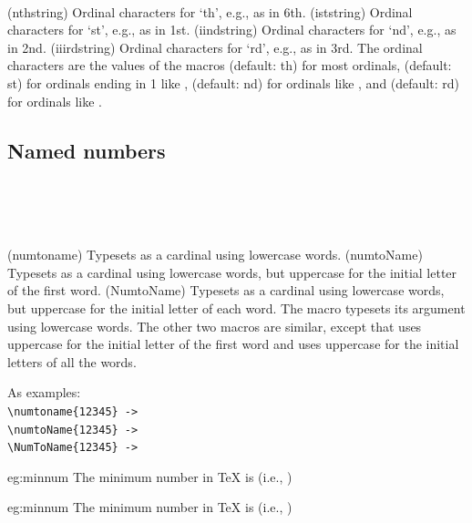 \begin{syntax}
\cmd{\nthstring} \cmd{\iststring} \cmd{\iindstring} \cmd{\iiirdstring} \\
\end{syntax}
\glossary(nthstring)%
  {}%
  {Ordinal characters for `th', e.g., as in 6th.}
\glossary(iststring)%
  {}%
  {Ordinal characters for `st', e.g., as in 1st.}
\glossary(iindstring)%
  {}%
  {Ordinal characters for `nd', e.g., as in 2nd.}
\glossary(iiirdstring)%
  {}%
  {Ordinal characters for `rd', e.g., as in 3rd.}
The ordinal characters are the values of the macros \cmd{\nthstring}
(default: th) for most ordinals, \cmd{\iststring} (default: st) for
ordinals ending in 1 like , \cmd{\iindstring} (default: nd)
for ordinals like , and \cmd{\iiirdstring} (default: rd)
for ordinals like .


\subsection{Named numbers}


\begin{syntax}
\cmd{\numtoname} \\
\cmd{\numtoName} \\
\cmd{\NumToName} \\
\end{syntax}
\glossary(numtoname)%
  {}%
  {Typesets  as a cardinal using lowercase words.}
\glossary(numtoName)%
  {}%
  {Typesets  as a cardinal using lowercase words, but uppercase for the initial
   letter of the first word.}
\glossary(NumtoName)%
  {}%
  {Typesets  as a cardinal using lowercase words, but uppercase for the initial
   letter of each word.}
The macro \cmd{\numtoname} typesets its  argument using 
lowercase words. The other two macros are similar, except that 
\cmd{\numtoName} uses uppercase for the initial letter of the first word and
\cmd{\NumToName} uses uppercase for the initial letters of all the words.

    As examples: \\
\verb?\numtoname{12345} ->?  \\
\verb?\numtoName{12345} ->?  \\
\verb?\NumToName{12345} ->?  \\
\begin{egsource}{eg:minnum}
The minimum number in TeX is 
(i.e., )
\end{egsource}
\begin{egresult}{eg:minnum}
  The minimum number in TeX is  
  (i.e., )
\end{egresult}

